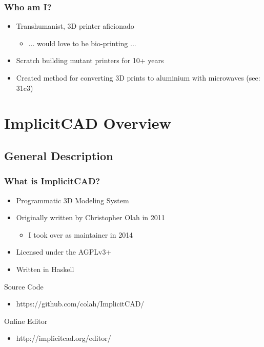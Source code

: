 \documentclass{beamer}
\begin{document}
\begin{frame}
\frametitle{Who am I?}
\begin{itemize}
\item Transhumanist, 3D printer aficionado
\begin{itemize}
\item ... would love to be bio-printing ...
\end{itemize}
\item Scratch building mutant printers for 10+ years
\item Created method for converting 3D prints to aluminium with microwaves (see: 31c3)
\end{itemize}
\end{frame}


\section{ImplicitCAD Overview}

\subsection{General Description}
\begin{frame}
\frametitle{What is ImplicitCAD?}
\begin{itemize}
\item Programmatic 3D Modeling System
\item Originally written by Christopher Olah in 2011
  \begin{itemize}
  \item I took over as maintainer in 2014
  \end{itemize}
\item Licensed under the AGPLv3+
\item Written in Haskell
\end{itemize}
\begin{block}{Source Code}
\begin{itemize}
\item https://github.com/colah/ImplicitCAD/
\end{itemize}
\end{block}
\begin{block}{Online Editor}
\begin{itemize}
\item http://implicitcad.org/editor/
\end{itemize}
\end{block}
\end{frame}
\end{document}
